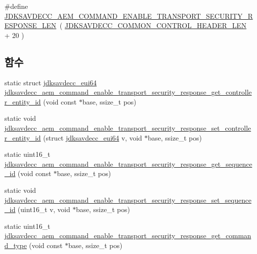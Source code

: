 \begin{DoxyCompactItemize}
\item 
\#define \hyperlink{group__command__enable__transport__security__response_ga223c1e5ef8ff2bc723fad4c3a535cf76}{J\+D\+K\+S\+A\+V\+D\+E\+C\+C\+\_\+\+A\+E\+M\+\_\+\+C\+O\+M\+M\+A\+N\+D\+\_\+\+E\+N\+A\+B\+L\+E\+\_\+\+T\+R\+A\+N\+S\+P\+O\+R\+T\+\_\+\+S\+E\+C\+U\+R\+I\+T\+Y\+\_\+\+R\+E\+S\+P\+O\+N\+S\+E\+\_\+\+L\+EN}~( \hyperlink{group__jdksavdecc__avtp__common__control__header_gaae84052886fb1bb42f3bc5f85b741dff}{J\+D\+K\+S\+A\+V\+D\+E\+C\+C\+\_\+\+C\+O\+M\+M\+O\+N\+\_\+\+C\+O\+N\+T\+R\+O\+L\+\_\+\+H\+E\+A\+D\+E\+R\+\_\+\+L\+EN} + 20 )
\end{DoxyCompactItemize}
\subsection*{함수}
\begin{DoxyCompactItemize}
\item 
static struct \hyperlink{structjdksavdecc__eui64}{jdksavdecc\+\_\+eui64} \hyperlink{group__command__enable__transport__security__response_ga1fcdb8fe1141eb4652721d9d12a7243e}{jdksavdecc\+\_\+aem\+\_\+command\+\_\+enable\+\_\+transport\+\_\+security\+\_\+response\+\_\+get\+\_\+controller\+\_\+entity\+\_\+id} (void const $\ast$base, ssize\+\_\+t pos)
\item 
static void \hyperlink{group__command__enable__transport__security__response_ga2dd152a8f4bbc06c27f19bbdb0ec94ff}{jdksavdecc\+\_\+aem\+\_\+command\+\_\+enable\+\_\+transport\+\_\+security\+\_\+response\+\_\+set\+\_\+controller\+\_\+entity\+\_\+id} (struct \hyperlink{structjdksavdecc__eui64}{jdksavdecc\+\_\+eui64} v, void $\ast$base, ssize\+\_\+t pos)
\item 
static uint16\+\_\+t \hyperlink{group__command__enable__transport__security__response_ga4f8356eb70662df52313d139410cd489}{jdksavdecc\+\_\+aem\+\_\+command\+\_\+enable\+\_\+transport\+\_\+security\+\_\+response\+\_\+get\+\_\+sequence\+\_\+id} (void const $\ast$base, ssize\+\_\+t pos)
\item 
static void \hyperlink{group__command__enable__transport__security__response_ga7fed8185797182b72b693e68f9bf7e68}{jdksavdecc\+\_\+aem\+\_\+command\+\_\+enable\+\_\+transport\+\_\+security\+\_\+response\+\_\+set\+\_\+sequence\+\_\+id} (uint16\+\_\+t v, void $\ast$base, ssize\+\_\+t pos)
\item 
static uint16\+\_\+t \hyperlink{group__command__enable__transport__security__response_gab54c60e8849f208590b6346a76cdad98}{jdksavdecc\+\_\+aem\+\_\+command\+\_\+enable\+\_\+transport\+\_\+security\+\_\+response\+\_\+get\+\_\+command\+\_\+type} (void const $\ast$base, ssize\+\_\+t pos)

\end{DoxyCompactItemize}
